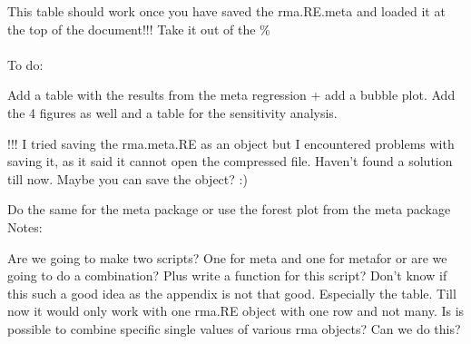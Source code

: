 \documentclass[11pt, a4paper]{article} %
\begin{document}
This table should work once you have saved the rma.RE.meta and loaded it at the top of the document!!! Take it out of the \% \\



\\
To do:

Add a table with the results from the meta regression + add a bubble plot. Add the 4 figures as well and a table for the sensitivity analysis. 

!!! I tried saving the rma.meta.RE as an object but I encountered problems with saving it, as it said it cannot open the compressed file. Haven't found a solution till now. Maybe you can save the object? :)

Do the same for the meta package or use the forest plot from the meta package\\

Notes:

Are we going to make two scripts? One for meta and one for metafor or are we going to do a combination? Plus write a function for this script? 
Don't know if this such a good idea as the appendix is not that good. Especially the table. Till now it would only work with one rma.RE object with one row and not many. Is is possible to combine specific single values of various rma objects? Can we do this?
\end{document}
